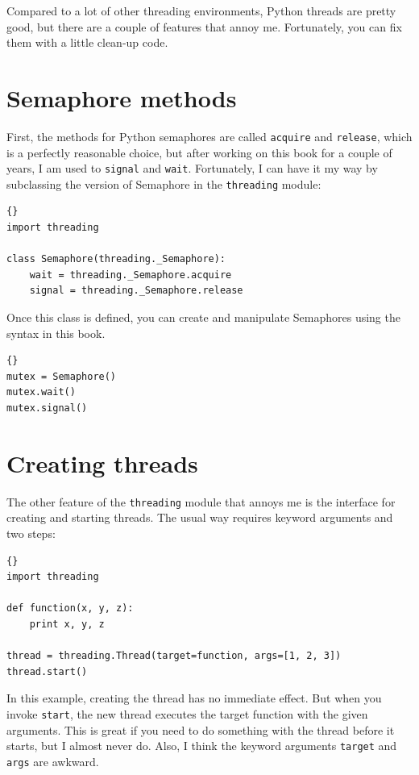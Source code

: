 \documentclass{book}
\begin{document}
Compared to a lot of other threading environments, Python threads are
pretty good, but there are a couple of features that annoy me.
Fortunately, you can fix them with a little clean-up code.

\section{Semaphore methods}

First, the methods for Python semaphores are called {\tt acquire}
and {\tt release}, which is a perfectly reasonable choice, but
after working on this book for a couple of years, I am used
to {\tt signal} and {\tt wait}.  Fortunately, I can have it
my way by subclassing the version of Semaphore in the
{\tt threading} module:

\begin{lstlisting}[caption={Semaphore name change}]{}
import threading
 
class Semaphore(threading._Semaphore):
    wait = threading._Semaphore.acquire
    signal = threading._Semaphore.release
\end{lstlisting}

Once this class is defined, you can create and manipulate Semaphores
using the syntax in this book.

\begin{lstlisting}[caption={Semaphore example}]{}
mutex = Semaphore()
mutex.wait()
mutex.signal()
\end{lstlisting}

\section{Creating threads}

The other feature of the {\tt threading} module that annoys
me is the interface for creating and starting threads.  The
usual way requires keyword arguments and two steps:

\begin{lstlisting}[caption={Thread example (standard way)}]{}
import threading

def function(x, y, z):
    print x, y, z

thread = threading.Thread(target=function, args=[1, 2, 3])
thread.start()
\end{lstlisting}

In this example, creating the thread has no immediate effect.
But when you invoke {\tt start}, the new thread executes
the target function with the given arguments.
This is great if you need to do something with the thread
before it starts, but I almost never do.
Also, I think the keyword arguments {\tt target} and {\tt args}
are awkward.
\end{document}
